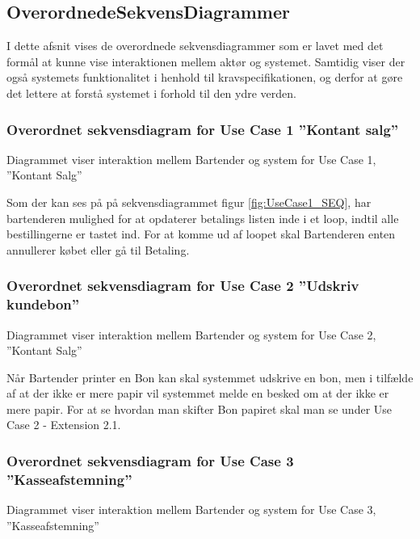 
\subsection{OverordnedeSekvensDiagrammer}
I dette afsnit vises de overordnede sekvensdiagrammer som er lavet med det formål at kunne vise interaktionen mellem aktør og systemet. Samtidig viser der også systemets funktionalitet i henhold til kravspecifikationen, og derfor at gøre det lettere at forstå systemet i forhold til den ydre verden. 


\subsubsection{Overordnet sekvensdiagram for Use Case 1 ''Kontant salg''}
Diagrammet viser interaktion mellem Bartender og system for Use Case 1, ''Kontant Salg'' 


Som der kan ses på på sekvensdiagrammet figur \ref{fig:UseCase1_SEQ}, har bartenderen mulighed for at opdaterer betalings listen inde i et loop, indtil alle bestillingerne er tastet ind. For at komme ud af loopet skal Bartenderen enten annullerer købet eller gå til Betaling. 


\subsubsection{Overordnet sekvensdiagram for Use Case 2 ''Udskriv kundebon''}
Diagrammet viser interaktion mellem Bartender og system for Use Case 2, ''Kontant Salg'' 


Når Bartender printer en Bon kan skal systemmet udskrive en bon, men i tilfælde af at der ikke er mere papir vil systemmet melde en besked om at der ikke er mere papir.
\newline\newline
For at se hvordan man skifter Bon papiret skal man se under Use Case 2 - Extension 2.1.



\subsubsection{Overordnet sekvensdiagram for Use Case 3 ''Kasseafstemning''}
Diagrammet viser interaktion mellem Bartender og system for Use Case 3, ''Kasseafstemning'' 

